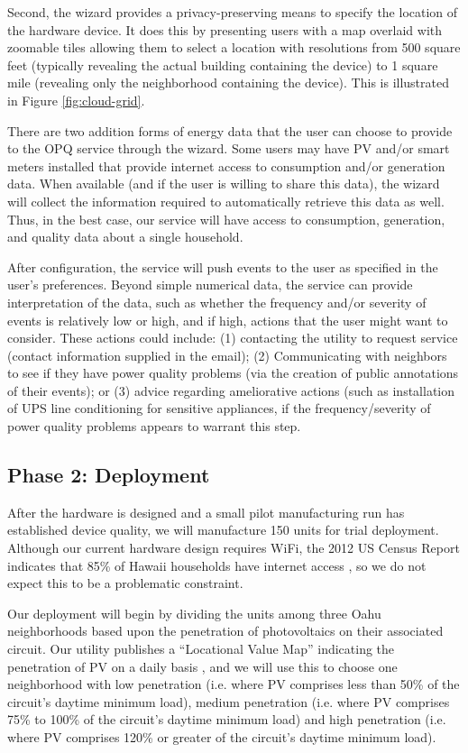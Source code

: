 Second, the wizard provides a privacy-preserving means to specify the location of the hardware device. It does this by presenting users with a map overlaid with zoomable tiles allowing them to select a location with resolutions from 500 square feet (typically revealing the actual building containing the device) to 1 square mile (revealing only the neighborhood containing the device). This is illustrated in Figure \ref{fig:cloud-grid}.

There are two addition forms of energy data that the user can choose to provide to the OPQ service through the wizard.  Some users may have PV and/or smart meters installed that provide internet access to consumption and/or generation data.  When available (and if the user is willing to share this data), the wizard will collect the information required to automatically retrieve this data as well.  Thus, in the best case, our service will have access to consumption, generation, and quality data about a single household.

After configuration, the service will push events to the user as specified in the user's preferences.  Beyond simple numerical data, the service can provide interpretation of the data, such as whether the frequency and/or severity of events is relatively low or high, and if high, actions that the user might want to consider.  These actions could include: (1) contacting the utility to request service (contact information supplied in the email); (2) Communicating with neighbors to see if they have power quality problems (via the creation of public annotations of their events); or (3) advice regarding ameliorative actions (such as installation of UPS line conditioning for sensitive appliances, if the frequency/severity of power quality problems appears to warrant this step.

\subsection{Phase 2: Deployment}

After the hardware is designed and a small pilot manufacturing run has established device quality, we will manufacture 150 units for trial deployment.  Although our current hardware design requires WiFi, the 2012 US Census Report indicates that 85\% of Hawaii households have internet access \cite{home-internet-access}, so we do not expect this to be a problematic constraint. 

Our deployment will begin by dividing the units among three Oahu neighborhoods based upon the penetration of photovoltaics on their associated circuit.  Our utility publishes a ``Locational Value Map'' indicating the penetration of PV on a daily basis \cite{lvm}, and we will use this to choose one neighborhood with low penetration (i.e. where PV comprises less than 50\% of the circuit's daytime minimum load), medium penetration (i.e. where PV comprises 75\% to 100\% of the circuit's daytime minimum load) and high penetration (i.e. where PV comprises 120\% or greater of the circuit's daytime minimum load). 

